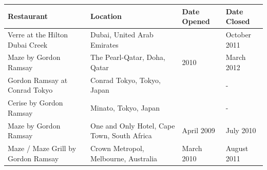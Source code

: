 \documentclass{article}
\begin{document}
\begin{tabular}{llll}
\toprule
Restaurant & Location & Date Opened & Date Closed \\
\midrule
Verre at the Hilton Dubai Creek & Dubai, United Arab Emirates &  & October 2011 \\
Maze by Gordon Ramsay & The Pearl-Qatar, Doha, Qatar & 2010 & March 2012 \\
Gordon Ramsay at Conrad Tokyo & Conrad Tokyo, Tokyo, Japan &  & - \\
Cerise by Gordon Ramsay & Minato, Tokyo, Japan &  & - \\
Maze by Gordon Ramsay & One and Only Hotel, Cape Town, South Africa & April 2009 & July 2010 \\
Maze / Maze Grill by Gordon Ramsay & Crown Metropol, Melbourne, Australia & March 2010 & August 2011 \\
\bottomrule
\end{tabular}
\end{document}
